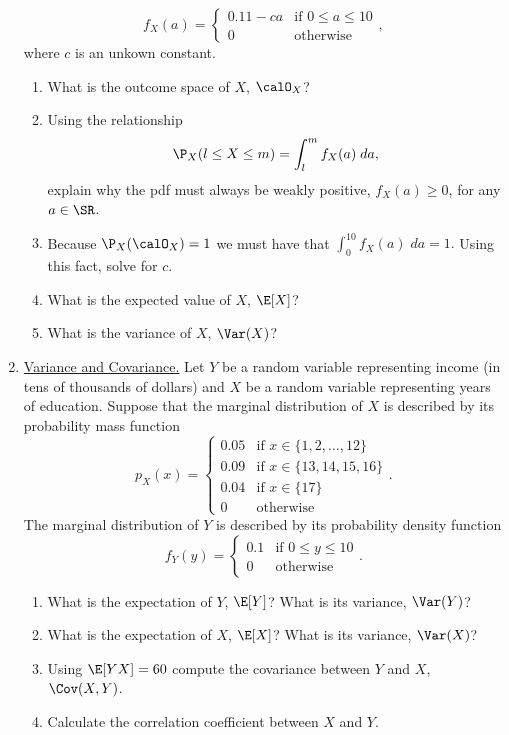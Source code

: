 \documentclass[10pt]{article}
\begin{document}
\begin{enumerate}
	\[
		f_X(a) = \begin{cases}
		    0.11- ca & \text{if } 0 \leq a \leq 10 \\
			0 &\text{otherwise }
		\end{cases}
	,\] 
	where \(c\) is an unkown constant.
	\begin{enumerate}
		\item What is the outcome space of \(X\), \(\calO_X\)? 
		\item Using the relationship 
		\[
			\P_X(l \leq X \leq m) = \int_l^m f_X(a)\;da
		,\]
		explain why the pdf must always be weakly positive, \(f_X(a) \geq 0\), for any \(a\in\SR\).
		\item Because \(\P_X(\calO_X)=1\) we must have that 
		\(
			\int_0^{10} f_X(a)\;da = 1
		.\)
		Using this fact, solve for \(c\).
	\item What is the expected value of \(X\), \(\E[X]\)?
	\item What is the variance of \(X\), \(\Var(X)\)?
	\end{enumerate}
	\item \underline{Variance and Covariance.} Let \(Y\) be a random variable representing income (in tens of thousands of dollars) and \(X\) be a random variable representing years of education. Suppose that the marginal distribution of \(X\) is described by its probability mass function
	\[
		p_X(x) = \begin{cases}
			0.05 & \text{if }x\in \{1,2,\dots,12\}  \\
			0.09 &\text{if }x \in \{13,14,15,16\}  \\
			0.04 &\text{if }x \in \{17\} \\
			0 &\text{otherwise }
		\end{cases}
	.\]
	The marginal distribution of \(Y\) is described by its probability density function
	\[
		f_Y(y) = \begin{cases}
			0.1	 & \text{if } 0\leq y\leq 10 \\
			0 &\text{otherwise }
		\end{cases}
	.\]	
	\begin{enumerate}
		\item What is the expectation of \(Y\),  \(\E[Y]\)? What is its variance,  \(\Var(Y)\)?
		\item What is the expectation of \(X\),  \(\E[X]\)? What is its variance, \(\Var(X)\)?
		\item Using \(\E[YX] = 60\) compute the covariance between  \(Y\) and  \(X\),  \(\Cov(X,Y)\).
		\item Calculate the correlation coefficient between \(X\) and  \(Y\).

\end{enumerate}
\end{enumerate}
\end{document}
